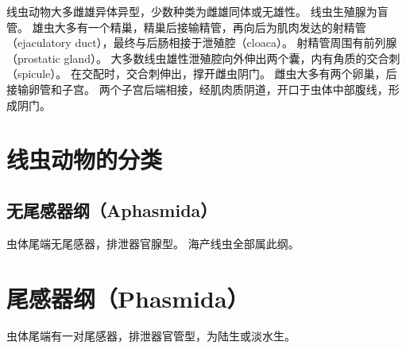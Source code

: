 \documentclass[11pt]{article}
\begin{document}
\newline

线虫动物大多雌雄异体异型，少数种类为雌雄同体或无雄性。
线虫生殖腺为盲管。
雄虫大多有一个精巢，精巢后接输精管，再向后为肌肉发达的射精管（ejaculatory duct），最终与后肠相接于泄殖腔（cloaca）。
射精管周围有前列腺（prostatic gland）。
大多数线虫雄性泄殖腔向外伸出两个囊，内有角质的交合刺（spicule）。
在交配时，交合刺伸出，撑开雌虫阴门。
雌虫大多有两个卵巢，后接输卵管和子宫。
两个子宫后端相接，经肌肉质阴道，开口于虫体中部腹线，形成阴门。
  
\section{线虫动物的分类}
\subsection{无尾感器纲（Aphasmida）}
虫体尾端无尾感器，排泄器官腺型。
海产线虫全部属此纲。
  
\section{尾感器纲（Phasmida）}
虫体尾端有一对尾感器，排泄器官管型，为陆生或淡水生。
  
\end{document}
